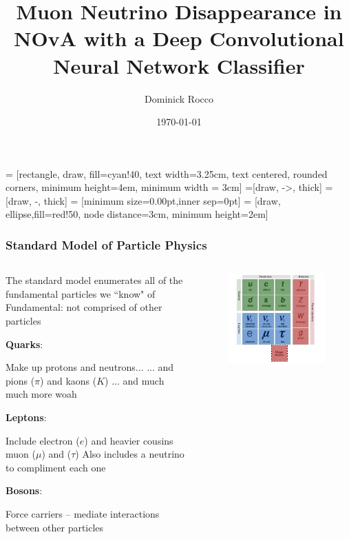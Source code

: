 \documentclass[10pt,professionalfonts,xcolor=table]{beamer}
\title[\numu Disappearance CNN]{Muon Neutrino Disappearance in NOvA with a Deep Convolutional Neural Network Classifier}
\author[D. Rocco]{Dominick Rocco}
\date{\today}
\institute{University of Minnesota}
\begin{document}
 = [rectangle, draw, fill=cyan!40,
   text width=3.25cm, text centered, rounded corners, minimum height=4em, minimum width = 3cm]
=[draw, ->, thick]
=[draw, -, thick]
 = [minimum size=0.00pt,inner sep=0pt]
 = [draw, ellipse,fill=red!50, node distance=3cm,
   minimum height=2em]

\frame{\titlepage}


\frame
{
  \frametitle{Standard Model of Particle Physics}

\begin{columns}[c]
  \begin{itemize}
  \bang The standard model enumerates all of the fundamental particles we ``know" of
  \bang Fundamental: not comprised of other particles

  \bang \textbf{Quarks}:
    \begin{itemize}
    \bing Make up protons and neutrons...
    \bong ... and pions ($\pi$) and kaons ($K$)
    \bong ... and much much more woah

    \end{itemize}
  \bang \textbf{Leptons}:
    \begin{itemize}
    \bing Include electron ($e$) and heavier cousins muon ($\mu$) and ($\tau$)
    \bing Also includes a neutrino to compliment each one
    \end{itemize}
  \bang \textbf{Bosons}:
    \begin{itemize}
    \bing Force carriers -- mediate interactions between other particles
    \end{itemize}

  \end{itemize}
    \begin{figure}
  \includegraphics[width=\textwidth]{figures/figures/stdmod.jpg}
  \end{figure}
\end{columns}

}
\end{document}
